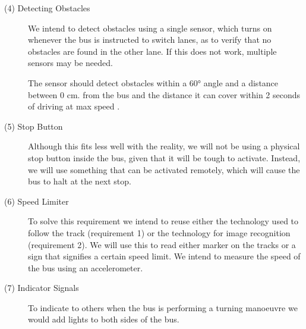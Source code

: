 \begin{description}
    \item[(4) Detecting Obstacles]
    We intend to detect obstacles using a single sensor, which turns on whenever the bus is instructed to switch lanes, as to verify that no obstacles are found in the other lane. If this does not work, multiple sensors may be needed.

    The sensor should detect obstacles within a 60° angle and a distance between 0 cm. from the bus and the distance it can cover within 2 seconds of driving at max speed \cite{holdAfstand}.
    
    \item[(5) Stop Button]
    Although this fits less well with the reality, we will not be using a physical stop button inside the bus, given that it will be tough to activate. Instead, we will use something that can be activated remotely, which will cause the bus to halt at the next stop.

    \item[(6) Speed Limiter]
    To solve this requirement we intend to reuse either the technology used to follow the track (requirement 1) or the technology for image recognition (requirement 2). We will use this to read either marker on the tracks or a sign that signifies a certain speed limit. We intend to measure the speed of the bus using an accelerometer. 
    

    \item[(7) Indicator Signals]
    To indicate to others when the bus is performing a turning manoeuvre we would add lights to both sides of the bus.
    
    
\end{description}


